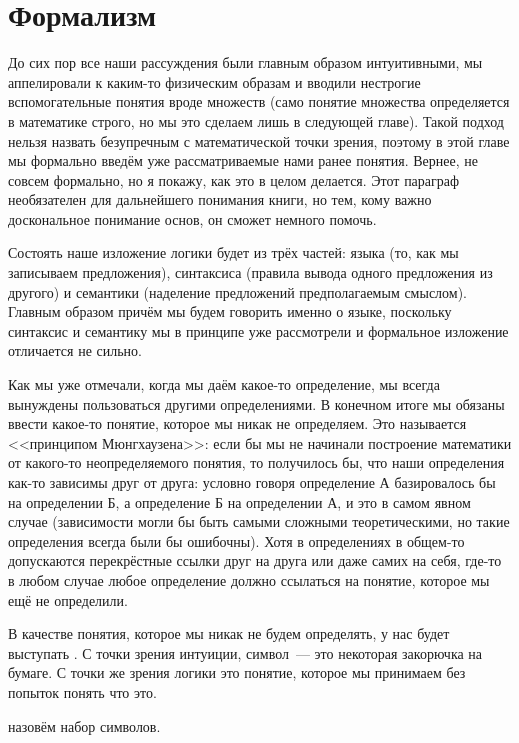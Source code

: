 \section{Формализм}

До сих пор все наши рассуждения были главным образом интуитивными, мы аппелировали к каким-то физическим образам и вводили нестрогие вспомогательные понятия вроде множеств (само понятие множества определяется в математике строго, но мы это сделаем лишь в следующей главе). Такой подход нельзя назвать безупречным с математической точки зрения, поэтому в этой главе мы формально введём уже рассматриваемые нами ранее понятия.  Вернее, не совсем формально, но я покажу, как это в целом делается. Этот параграф необязателен для дальнейшего понимания книги, но тем, кому важно доскональное понимание основ, он сможет немного помочь.

Состоять наше изложение логики будет из трёх частей: языка (то, как мы записываем предложения), синтаксиса (правила вывода одного предложения из другого) и семантики (наделение предложений предполагаемым смыслом). Главным образом причём мы будем говорить именно о языке, поскольку синтаксис и семантику мы в принципе уже рассмотрели и формальное изложение отличается не сильно.

Как мы уже отмечали, когда мы даём какое-то определение, мы всегда вынуждены пользоваться другими определениями. В конечном итоге мы обязаны ввести какое-то понятие, которое мы никак не определяем. Это называется <<принципом Мюнгхаузена>>: если бы мы не начинали построение математики от какого-то неопределяемого понятия, то получилось бы, что наши определения как-то зависимы друг от друга: условно говоря определение А базировалось бы на определении Б, а определение Б на определении А, и это в самом явном случае (зависимости могли бы быть самыми сложными теоретическими, но такие определения всегда были бы ошибочны). Хотя в определениях в общем-то допускаются перекрёстные ссылки друг на друга или даже самих на себя, где-то в любом случае любое определение должно ссылаться на понятие, которое мы ещё не определили.

В качестве понятия, которое мы никак не будем определять, у нас будет выступать . С точки зрения интуиции, символ~--- это некоторая закорючка на бумаге. С точки же зрения логики это понятие, которое мы принимаем без попыток понять что это.

\begin{definition}
 назовём набор символов.
\end{definition}

